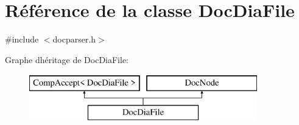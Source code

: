 \hypertarget{class_doc_dia_file}{}\section{Référence de la classe Doc\+Dia\+File}
\label{class_doc_dia_file}


{\ttfamily \#include $<$docparser.\+h$>$}

Graphe d\textquotesingle{}héritage de Doc\+Dia\+File\+:\begin{figure}[H]
\begin{center}
\leavevmode
\includegraphics[height=2.000000cm]{class_doc_dia_file}
\end{center}
\end{figure}

